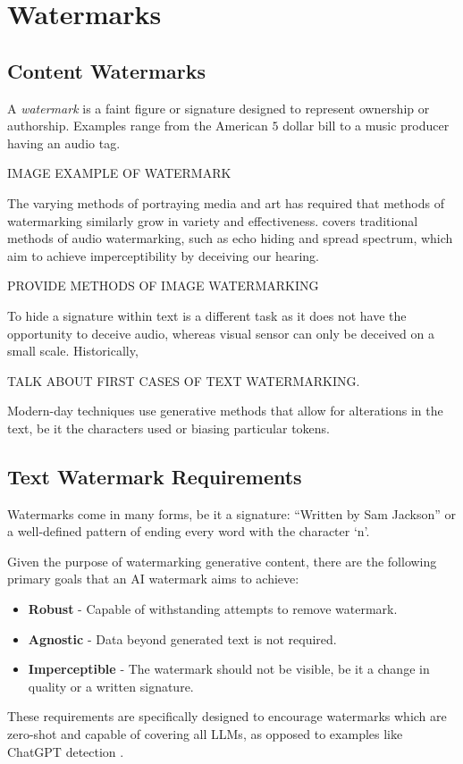\documentclass{l4proj}
\theoremstyle{definition}
\begin{document}
\section{Watermarks}
    \subsection{Content Watermarks}
        A \textit{watermark} is a faint figure or signature designed to represent ownership or authorship. Examples range from the American $5$ dollar bill to a music producer having an audio tag.
        
        IMAGE EXAMPLE OF WATERMARK

        The varying methods of portraying media and art has required that methods of watermarking similarly grow in variety and effectiveness. \citet{xiang2017digital} covers traditional methods of audio watermarking, such as echo hiding and spread spectrum, which aim to achieve imperceptibility by deceiving our hearing. 
        
        PROVIDE METHODS OF IMAGE WATERMARKING 

        To hide a signature within text is a different task as it does not have the opportunity to deceive audio, whereas visual sensor can only be deceived on a small scale. Historically, 
        
        TALK ABOUT FIRST CASES OF TEXT WATERMARKING. 
        
        Modern-day techniques use generative methods that allow for alterations in the text, be it the characters used or biasing particular tokens.
    \subsection{Text Watermark Requirements}
         Watermarks come in many forms, be it a signature: ``Written by Sam Jackson'' or a well-defined pattern of ending every word with the character `n'.
         
         Given the purpose of watermarking generative content, there are the following primary goals that an AI watermark aims to achieve:
         \begin{itemize}
            \setlength\itemsep{0.5em}
            \item \textbf{Robust} - Capable of withstanding attempts to remove watermark.
            \item \textbf{Agnostic} - Data beyond generated text is not required.
            \item \textbf{Imperceptible} - The watermark should not be visible, be it a change in quality or a written signature.
        \end{itemize}
        These requirements are specifically designed to encourage watermarks which are zero-shot and capable of covering all LLMs, as opposed to examples like ChatGPT detection \cite{perhaps an example/rewrite this}.
\end{document}
